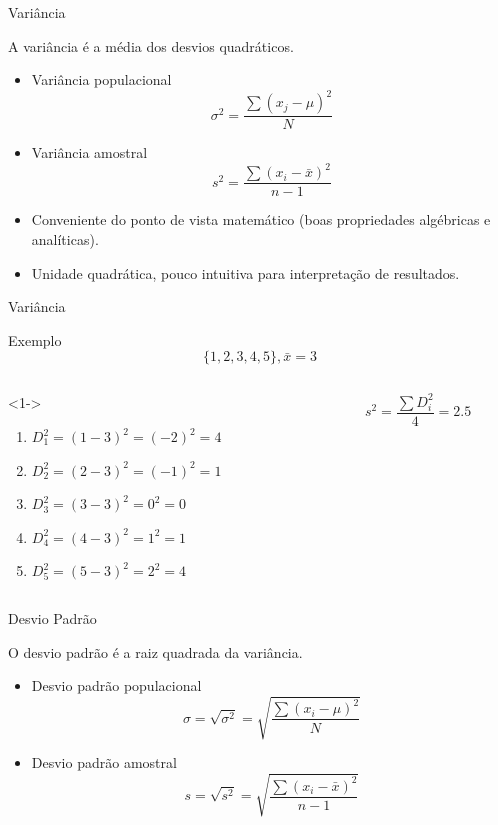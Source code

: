 \documentclass{beamer}
\begin{document}
\begin{frame}{Variância}
  \begin{definition}
    A variância é a média dos desvios quadráticos.
  \end{definition}
  \begin{itemize}
  \item Variância populacional
$$\sigma^2 = \frac{\sum (x_j - \mu)^2}{N}$$
\item Variância amostral
$$s^2 = \frac{\sum (x_i - \bar{x})^2}{n-1}$$
\item Conveniente do ponto de vista matemático (boas propriedades
  algébricas e analíticas).
\item Unidade quadrática, pouco intuitiva para interpretação de
  resultados.
  \end{itemize}
\end{frame}

\begin{frame}{Variância}
  \begin{exampleblock}{Exemplo}
      \begin{displaymath}
    \{1,2,3,4,5\}, \bar{x} = 3
  \end{displaymath}
  \begin{columns}
    \begin{column}{6cm}<1->
      \begin{enumerate}
      \item $D_1^2 = (1-3)^2 = (-2)^2 = 4$
      \item $D_2^2 = (2-3)^2 = (-1)^2 = 1$
      \item $D_3^2 = (3-3)^2 = 0^2 =0$
      \item $D_4^2 = (4-3)^2 = 1^2 = 1$
      \item $D_5^2 = (5-3)^2 = 2^2 = 4 $
      \end{enumerate}
    \end{column}
    \begin{column}{4cm}
      \begin{displaymath}
        s^2 = \frac{\sum D_i^2}{4} = 2.5
      \end{displaymath}
    \end{column}
  \end{columns}
  \end{exampleblock}
\end{frame}

\begin{frame}{Desvio Padrão}
  \begin{definition}
    O desvio padrão é a raiz quadrada da variância.
  \end{definition}
  \begin{itemize}
  \item Desvio padrão populacional
    $$ \sigma = \sqrt{ \sigma^2 } = \sqrt{ \frac{\sum (x_i - \mu)^2}{N} } $$
  \item Desvio padrão amostral
    $$ s = \sqrt{s^2 } = \sqrt{ \frac{\sum (x_i - \bar{x})^2}{n-1} } $$
  \end{itemize}
\end{frame}
\end{document}
